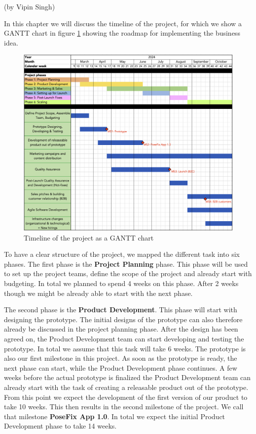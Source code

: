 (by Vipin Singh)

\p
In this chapter we will discuss the timeline of the project, for which we show a GANTT chart in figure \ref{fig:timeline_gantt} showing the roadmap for implementing the business idea.

\begin{figure}[H]
    \centering
    \includegraphics[width=\textwidth]{figures/GANTT_timeline.png}
    \caption{Timeline of the project as a GANTT chart}
    \label{fig:timeline_gantt}
\end{figure}

To have a clear structure of the project, we mapped the different task into six phases.
The first phase is the \textbf{Project Planning} phase.
This phase will be used to set up the project teams, define the scope of the project and already start with budgeting.
In total we planned to spend 4 weeks on this phase.
After 2 weeks though we might be already able to start with the next phase.

\p
The second phase is the \textbf{Product Development}.
This phase will start with designing the prototype.
The initial designs of the prototype can also therefore already be discussed in the project planning phase.
After the design has been agreed on, the Product Development team can start developing and testing the prototype.
In total we assume that this task will take 6 weeks.
The prototype is also our first milestone in this project.
As soon as the prototype is ready, the next phase can start, while the Product Development phase continues.
A few weeks before the actual prototype is finalized the Product Development team can already start with the task of creating a releasable product out of the prototype.
From this point we expect the development of the first version of our product to take 10 weeks.
This then results in the second milestone of the project.
We call that milestone \textbf{PoseFix App 1.0}.
In total we expect the initial Product Development phase to take 14 weeks.

